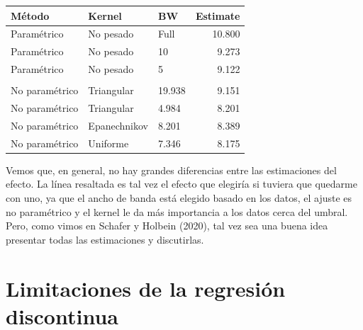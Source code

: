 \documentclass[
  letterpaper,
  DIV=11,
  numbers=noendperiod,
  oneside]{scrreprt}
\begin{document}
\begin{table}
\fontsize{12.0pt}{14.4pt}\selectfont
\begin{tabular*}{\linewidth}{@{\extracolsep{\fill}}lllr}
\toprule
Método & Kernel & BW & Estimate \\ 
\midrule\addlinespace[2.5pt]
Paramétrico & No pesado & Full & 10.800 \\ 
Paramétrico & No pesado & 10 & 9.273 \\ 
Paramétrico & No pesado & 5 & 9.122 \\ 
{\bfseries \cellcolor[HTML]{rgba(255,255,224,0.8)}{\textcolor[HTML]{000000}{No paramétrico}}} & {\bfseries \cellcolor[HTML]{rgba(255,255,224,0.8)}{\textcolor[HTML]{000000}{Triangular}}} & {\bfseries \cellcolor[HTML]{rgba(255,255,224,0.8)}{\textcolor[HTML]{000000}{9.969}}} & {\bfseries \cellcolor[HTML]{rgba(255,255,224,0.8)}{\textcolor[HTML]{000000}{8.578}}} \\ 
No paramétrico & Triangular & 19.938 & 9.151 \\ 
No paramétrico & Triangular & 4.984 & 8.201 \\ 
No paramétrico & Epanechnikov & 8.201 & 8.389 \\ 
No paramétrico & Uniforme & 7.346 & 8.175 \\ 
\bottomrule
\end{tabular*}
\end{table}

Vemos que, en general, no hay grandes diferencias entre las estimaciones
del efecto. La línea resaltada es tal vez el efecto que elegiría si
tuviera que quedarme con uno, ya que el ancho de banda está elegido
basado en los datos, el ajuste es no paramétrico y el kernel le da más
importancia a los datos cerca del umbral. Pero, como vimos en Schafer y
Holbein
(2020),
tal vez sea una buena idea presentar todas las estimaciones y
discutirlas.

\hypertarget{limitaciones-de-la-regresiuxf3n-discontinua}{%
\section{Limitaciones de la regresión
discontinua}\label{limitaciones-de-la-regresiuxf3n-discontinua}}
\end{document}
